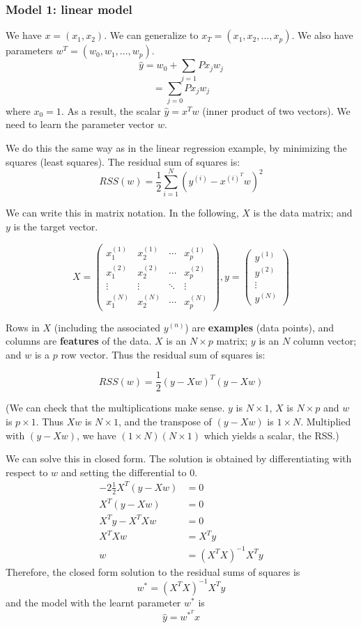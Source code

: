 \documentclass[a4paper,12pt]{article}
\begin{document}
\subsubsection{Model 1: linear model}

We have $x = (x_1, x_2)$. We can generalize to $x_T = (x_1, x_2, ..., x_p)$. We also have parameters $w^T = (w_0, w_1, ..., w_p)$. 
$$\hat y = w_0 + \sum_{j=1}P x_j w_j $$
$$= \sum_{j=0}P x_j w_j$$ 
where $x_0 = 1$. 
As a result, the scalar $\hat y = x^Tw$ (inner product of two vectors). We need to learn the parameter vector $w$. 

We do this the same way as in the linear regression example, by minimizing the squares (least squares). The residual sum of squares is: 
$$RSS(w) = \frac{1}{2} \sum_{i=1}^N (y^{(i)} - x^{(i)^T}w)^2$$

We can write this in matrix notation. In the following, $X$ is the data matrix; and $y$ is the target vector. 

$$X = \begin{pmatrix}
   x_1^{(1)} & x_2^{(1)} & \cdots & x_p^{(1)} \\
   x_1^{(2)} & x_2^{(2)} & \cdots & x_p^{(2)} \\
   \vdots & \vdots & \ddots & \vdots\\
   x_1^{(N)} & x_2^{(N)} & \cdots & x_p^{(N)}
\end{pmatrix}, 
y = \begin{pmatrix}
y^{(1)}\\
y^{(2)}\\
\vdots\\
y^{(N)}
\end{pmatrix}$$

Rows in $X$ (including the associated $y^{(n)}$) are \textbf{examples} (data points), and columns are \textbf{features} of the data. $X$ is an $N\times p$ matrix; $y$ is an $N$ column vector; and $w$ is a $p$ row vector. Thus the residual sum of squares is: 

$$RSS(w) = \frac{1}{2}(y - Xw)^T(y - Xw)$$

(We can check that the multiplications make sense. $y$ is $N\times 1$, $X$ is $N\times p$ and $w$ is $p\times 1$. Thus $Xw$ is $N\times 1$, and the transpose of $(y-Xw)$ is $1\times N$. Multiplied with $(y-Xw)$, we have $(1\times N)(N\times 1)$ which yields a scalar, the RSS.)

We can solve this in closed form. The solution is obtained by differentiating with respect to $w$ and setting the differential to 0. 
\begin{align*}
-2 \frac{1}{2} X^T (y - Xw) &= 0\\
X^T (y - Xw) &= 0\\
X^Ty - X^TXw &= 0\\
X^TXw &= X^Ty\\
w &= (X^TX)^{-1}X^Ty
\end{align*}
Therefore, the closed form solution to the residual sums of squares is  
$$w^* = (X^T X)^{-1} X^T y$$
and the model with the learnt parameter $w^*$ is $$\hat y = w^{*^T} x$$
\end{document}
